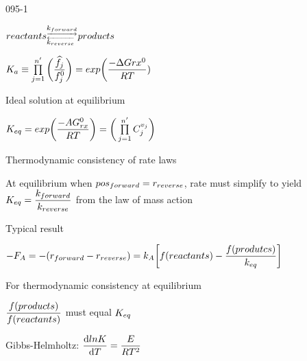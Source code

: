 \begin{mitframe}{095-1}
 \begin{listone}
	\item $reactants ^{\underrightarrow{\thermcond_{forward}}}_{\overleftarrow{\thermcond_{reverse}}}products$
    \item  $\eqconst\equiv\prod\limits_{j=1}^{n'}\bigg(\dfrac{\mixfug_j}{\fug_j^{\init}}\bigg)=exp\bigg(\dfrac{-\iipf\gibbs{rx}^{\init}}{\gasconst\Temp})$
    	\begin{listtwo}
        	\item Ideal solution at equilibrium
            	\begin{listthree}
                	\item $\dilfac_{eq}=exp\bigg(\dfrac{-\helmholtz\gibbs^{\init}_{rx}}{\gasconst\Temp}\bigg)=\bigg(\prod\limits_{j=1}^{n'}\conc_j^{\vvel_j}\bigg)$
                    \end{listthree}
        	\item Thermodynamic consistency of rate laws
            	\begin{listthree}
                	\item At equilibrium when $pos_{forward}=\pos_{reverse}$, rate must simplify to yield\\
                    $\dilfac_{eq}=\dfrac{\thermcond_{forward}}{\thermcond_{reverse}}$ from the law of mass action
                    \item Typical result
                    \begin{listfour}
                    	\item $-\force_{\helmholtz}=-(\pos_{forward}-\pos_{reverse})=\thermcond_{\helmholtz}\bigg[\fug(reactants)-\dfrac{\fug(produtcs)}{\thermcond_{eq}}\bigg]$
                        	\begin{listfive}
                            	\item For thermodynamic consistency at equilibrium
                                \begin{listsix}
                                	\item $\dfrac{\fug(products)}{\fug(reactants)}$ must equal $\dilfac_{eq}$
                                \end{listsix}
                            \end{listfive}
                    \end{listfour}
                \end{listthree}
        	\item Gibbs-Helmholtz: $\dfrac{\mathrm{d}ln\dilfac}{\mathrm{d}\Temp}=\dfrac{\energy}{\gasconst\Temp^2}$
        \end{listtwo}
\end{listone}
\end{mitframe}